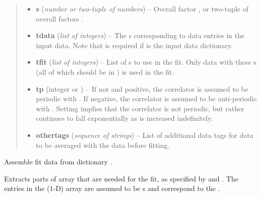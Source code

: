 \documentclass[letterpaper,10pt,english]{sphinxmanual}
\begin{document}
\begin{fulllineitems}
\begin{quote}
\begin{description}
\begin{itemize}
\item {} 
\textbf{s} (\emph{number or two-tuple of numbers}) -- Overall factor , or two-tuple of overall factors 
.

\item {} 
\textbf{tdata} (\emph{list of integers}) -- The s corresponding to data entries in the input
data. Note that  is
required if  is the input data dictionary.

\item {} 
\textbf{tfit} (\emph{list of integers}) -- List of s to use in the fit. Only data with these
s (all of which should be in ) is used in the fit.

\item {} 
\textbf{tp} (integer or ) -- If not  and positive, the correlator is assumed to 
be periodic with . If negative, the correlator
is assumed to be anti-periodic with . Setting
 implies that the correlator is not periodic, but rather
continues to fall exponentially as  is increased indefinitely.

\item {} 
\textbf{othertags} (\emph{sequence of strings}) -- List of additional data tags for data to be
averaged with the  data before fitting.

\end{itemize}

\end{description}\end{quote}

\begin{fulllineitems}
\label{corrfitter:corrfitter.Corr2.builddata}
Assemble fit data from dictionary .

Extracts parts of array  that are needed for
the fit, as specified by  and . The entries
in the (1-D) array  are assumed to be
s and correspond to the .

\end{fulllineitems}



\end{fulllineitems}
\end{document}
